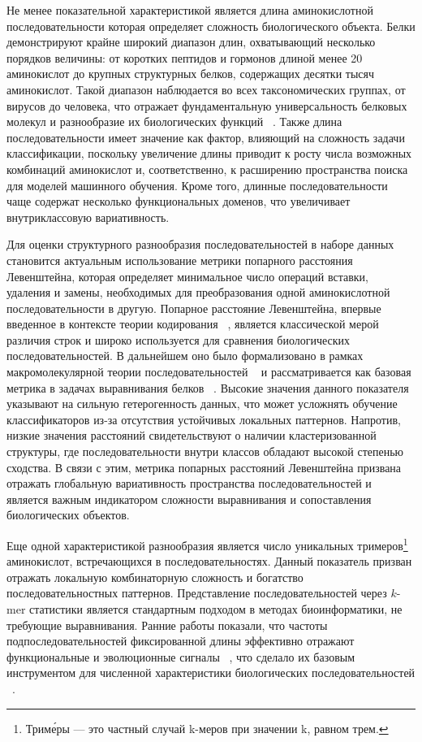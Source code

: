 \documentclass[specification,annotation,times]{itmo-student-thesis}
\begin{document}
Не менее показательной характеристикой является длина аминокислотной последовательности которая определяет сложность биологического объекта. Белки демонстрируют крайне широкий диапазон длин, охватывающий несколько порядков величины: от коротких пептидов и гормонов длиной менее 20 аминокислот до крупных структурных белков, содержащих десятки тысяч аминокислот. Такой диапазон наблюдается во всех таксономических группах, от вирусов до человека, что отражает фундаментальную универсальность белковых молекул и разнообразие их биологических функций ~\cite{Boutet2007}. 
Также длина последовательности имеет значение как фактор, влияющий на сложность задачи классификации, поскольку увеличение длины приводит к росту числа возможных комбинаций аминокислот и, соответственно, к расширению пространства поиска для моделей машинного обучения. Кроме того, длинные последовательности чаще содержат несколько функциональных доменов, что увеличивает внутриклассовую вариативность.

Для оценки структурного разнообразия последовательностей в наборе данных становится актуальным использование метрики попарного расстояния Левенштейна, которая определяет минимальное число операций вставки, удаления и замены, необходимых для преобразования одной аминокислотной последовательности в другую.
Попарное расстояние Левенштейна, впервые введенное в контексте теории кодирования ~\cite{lev-dist}, является классической мерой различия строк и широко используется для сравнения биологических последовательностей. В дальнейшем оно было формализовано в рамках макромолекулярной теории последовательностей ~\cite{doi:10.1137/1025045} и рассматривается как базовая метрика в задачах выравнивания белков ~\cite{9097943}.
Высокие значения данного показателя указывают на сильную гетерогенность данных, что может усложнять обучение классификаторов из-за отсутствия устойчивых локальных паттернов. Напротив, низкие значения расстояний свидетельствуют о наличии кластеризованной структуры, где последовательности внутри классов обладают высокой степенью сходства. В связи с этим, метрика попарных расстояний Левенштейна призвана отражать глобальную вариативность пространства последовательностей и является важным индикатором сложности выравнивания и сопоставления биологических объектов.

Еще одной характеристикой разнообразия является число уникальных тримеров\footnote{Трим\'еры — это частный случай k-меров при значении k, равном трем.} аминокислот, встречающихся в последовательностях. Данный показатель призван отражать локальную комбинаторную сложность и богатство последовательностных паттернов. 
Представление последовательностей через $k$-mer статистики является стандартным подходом в методах биоинформатики, не требующие выравнивания. Ранние работы показали, что частоты подпоследовательностей фиксированной длины эффективно отражают функциональные и эволюционные сигналы ~\cite{vinga2003alignment}, что сделало их базовым инструментом для численной характеристики биологических последовательностей ~\cite{edwards2012real}.
\end{document}
